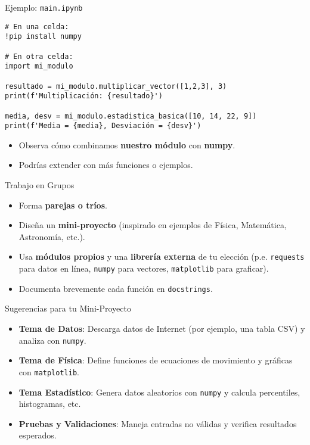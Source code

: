 \documentclass[10pt]{beamer}
\begin{document}
\begin{frame}[fragile]{Ejemplo: \texttt{main.ipynb}}
\begin{verbatim}
# En una celda:
!pip install numpy

# En otra celda:
import mi_modulo

resultado = mi_modulo.multiplicar_vector([1,2,3], 3)
print(f'Multiplicación: {resultado}')

media, desv = mi_modulo.estadistica_basica([10, 14, 22, 9])
print(f'Media = {media}, Desviación = {desv}')
\end{verbatim}
\begin{itemize}
  \item Observa cómo combinamos \textbf{nuestro módulo} con \textbf{numpy}.
  \item Podrías extender con más funciones o ejemplos.
\end{itemize}
\end{frame}

\begin{frame}{Trabajo en Grupos}
  \begin{itemize}
    \item Forma \textbf{parejas o tríos}.
    \item Diseña un \textbf{mini-proyecto} (inspirado en ejemplos de Física, Matemática, Astronomía, etc.).
    \item Usa \textbf{módulos propios} y una \textbf{librería externa} de tu elección (p.e. \texttt{requests} para datos en línea, \texttt{numpy} para vectores, \texttt{matplotlib} para graficar).
    \item Documenta brevemente cada función en \texttt{docstrings}.
  \end{itemize}
\end{frame}

\begin{frame}{Sugerencias para tu Mini-Proyecto}
  \begin{itemize}
    \item \textbf{Tema de Datos}: Descarga datos de Internet (por ejemplo, una tabla CSV) y analiza con \texttt{numpy}.
    \item \textbf{Tema de Física}: Define funciones de ecuaciones de movimiento y gráficas con \texttt{matplotlib}.
    \item \textbf{Tema Estadístico}: Genera datos aleatorios con \texttt{numpy} y calcula percentiles, histogramas, etc.
    \item \textbf{Pruebas y Validaciones}: Maneja entradas no válidas y verifica resultados esperados.
  \end{itemize}
\end{frame}
\end{document}
